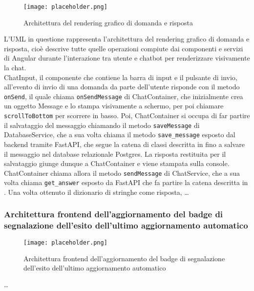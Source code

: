 \begin{figure}[h]
    \centering
    \texttt{[image: placeholder.png]}
    \caption{Architettura del rendering grafico di domanda e risposta}
\end{figure}

L'UML in questione rappresenta l'architettura del rendering grafico di domanda e risposta, cioè descrive tutte quelle operazioni compiute dai componenti e servizi di Angular durante l'interazione tra utente e chatbot per renderizzare visivamente la chat.\\
ChatInput, il componente che contiene la barra di input e il pulsante di invio, all'evento di invio di una domanda da parte dell'utente risponde con il metodo \texttt{onSend}, il quale chiama \texttt{onSendMessage} di ChatContainer, che inizialmente crea un oggetto Message e lo stampa visivamente a schermo, per poi chiamare \texttt{scrollToBottom} per scorrere in basso. Poi, ChatContainer si occupa di far partire il salvataggio del messaggio chiamando il metodo \texttt{saveMessage} di DatabaseService, che a sua volta chiama il metodo \texttt{save\_message} esposto dal backend tramite FastAPI, che segue la catena di classi descritta in  fino a salvare il messaggio nel database relazionale Postgres. La risposta restituita per il salvataggio giunge dunque a ChatContainer e viene stampata sulla console. ChatContainer chiama allora il metodo \texttt{sendMessage} di ChatService, che a sua volta chiama \texttt{get\_answer} esposto da FastAPI che fa partire la catena descritta in . Una volta ottenuto il dizionario di stringhe come risposta, \dots

\newpage


\subsubsection{Architettura frontend dell’aggiornamento del badge di segnalazione dell’esito dell’ultimo aggiornamento automatico}
\label{sec:architettura_frontend_badge_aggiornamento}

\begin{figure}[h]
    \centering
    \texttt{[image: placeholder.png]}
    \caption{Architettura frontend dell’aggiornamento del badge di segnalazione dell’esito dell’ultimo aggiornamento automatico}
\end{figure}

\dots

